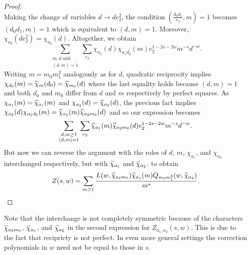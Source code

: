 \documentclass[12pt,reqno,oneside]{amsart}
\begin{document}
\begin{proof}
\[        \]
        Making the change of variables $d \to de_{2}^{2}$, the condition $\left(\frac{d_{0}d_{1}}{e_{2}},m\right) = 1$ becomes $(d_{0}d_{1},m) = 1$ which is equivalent to $(d,m) = 1$. Moreover, $\chi_{a_{2}}(de_{2}^{2}) = \chi_{a_{2}}(d)$. Altogether, we obtain
        \[
            \sum_{\substack{\text{$m,d$ odd} \\ (d,m) = 1}}\sum_{e_{2}}\chi_{a_{2}}(d)\chi_{a_{1}d_{0}}(m)e_{2}^{1-2s-2w}m^{-s}d^{-w}.
        \]
        Writing $m = m_{0}m_{1}^{2}$ analogously as for $d$, quadratic reciprocity implies $\chi_{d_{0}}(m) = \widetilde{\chi}_{m}(d_{0}) = \widetilde{\chi}_{m_{0}}(d)$ where the last equality holds because $(d,m) = 1$ and both $d_{0}$ and $m_{0}$ differ from $d$ and $m$ respectively by perfect squares. As $\chi_{a_{1}}(m) = \widetilde{\chi}_{a_{1}}(m)$ and $\chi_{a_{2}}(d) = \widetilde{\chi}_{a_{2}}(d)$, the previous fact implies $\chi_{a_{2}}(d)\chi_{a_{1}d_{0}}(m) = \widetilde{\chi}_{a_{1}}(m)\widetilde{\chi}_{a_{2}m_{0}}(d)$ and so our expression becomes
        \[
            \sum_{\substack{d,m \ge 1 \\ (d,m) = 1}}\sum_{e_{2}}\widetilde{\chi}_{a_{1}}(m)\widetilde{\chi}_{a_{2}m_{0}}(d)e_{2}^{1-2s-2w}m^{-s}d^{-w}.
        \]
        But now we can reverse the argument with the roles of $d$, $m$, $\chi_{a_{1}}$, and $\chi_{a_{2}}$ interchanged respectively, but with $\widetilde{\chi}_{a_{1}}$ and $\widetilde{\chi}_{a_{2}}$, to obtain
        \[
            Z(s,w) = \sum_{m \ge 1}\frac{L(w,\widetilde{\chi}_{a_{2}m_{0}})\widetilde{\chi}_{a_{1}}(m)Q_{m_{0}m_{1}^{2}}(w,\widetilde{\chi}_{a_{2}})}{m^{s}}.
        \]
    \end{proof}

    Note that the interchange is not completely symmetric because of the characters $\widetilde{\chi}_{a_{2}m_{0}}$, $\widetilde{\chi}_{a_{1}}$, and $\widetilde{\chi}_{a_{2}}$ in the second expression for $Z_{a_{1},a_{2}}(s,w)$. This is due to the fact that recipricty is not perfect. In even more general settings the correction polynomials in $w$ need not be equal to those in $s$.
\end{document}
